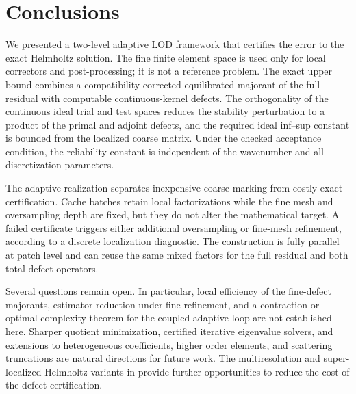 \section{Conclusions}\label{sec:conclusions}

We presented a two-level adaptive LOD framework that certifies the error to
the exact Helmholtz solution.  The fine finite element space is used only
for local correctors and post-processing; it is not a reference problem.
The exact upper bound combines a compatibility-corrected equilibrated
majorant of the full residual with computable continuous-kernel defects.
The orthogonality of the continuous ideal trial and test spaces reduces the
stability perturbation to a product of the primal and adjoint defects, and
the required ideal inf--sup constant is bounded from the localized coarse
matrix.  Under the checked acceptance condition, the reliability constant
is independent of the wavenumber and all discretization parameters.

The adaptive realization separates inexpensive coarse marking from costly
exact certification.  Cache batches retain local factorizations while the
fine mesh and oversampling depth are fixed, but they do not alter the
mathematical target.  A failed certificate triggers either additional
oversampling or fine-mesh refinement, according to a discrete localization
diagnostic.  The construction is fully parallel at patch level and can
reuse the same mixed factors for the full residual and both total-defect
operators.

Several questions remain open.  In particular, local efficiency of the
fine-defect majorants, estimator reduction under fine refinement, and a
contraction or optimal-complexity theorem for the coupled adaptive loop are
not established here.  Sharper quotient minimization, certified iterative
eigenvalue solvers, and extensions to heterogeneous coefficients, higher
order elements, and scattering truncations are natural directions for
future work.  The multiresolution and super-localized Helmholtz variants in
\cite{HauckPeterseim2022,FreeseHauckPeterseim2024} provide further
opportunities to reduce the cost of the defect certification.

